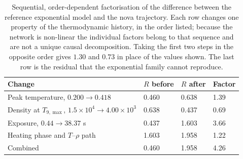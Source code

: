 \begin{table}[h!]
\centering
\caption{Sequential, order-dependent factorisation of the difference between the reference exponential model and the nova trajectory. Each row changes one property of the thermodynamic history, in the order listed; because the network is non-linear the individual factors belong to that sequence and are not a unique causal decomposition. Taking the first two steps in the opposite order gives $1.30$ and $0.73$ in place of the values shown. The last row is the residual that the exponential family cannot reproduce.}
\begin{tabular}{llll}
\hline
Change & $R$ before & $R$ after & Factor \\
\hline
Peak temperature, $0.200 \rightarrow 0.418$ & 0.460 & 0.638 & 1.39 \\
Density at $T_{9,\max}$, $1.5\times10^{4} \rightarrow 4.00\times10^{3}$ & 0.638 & 0.437 & 0.69 \\
Exposure, $0.44 \rightarrow 38.37$ s & 0.437 & 1.603 & 3.66 \\
Heating phase and $T$--$\rho$ path & 1.603 & 1.958 & 1.22 \\
\hline
Combined & 0.460 & 1.958 & 4.26 \\
\hline
\end{tabular}
\label{tab:nucnetpy_decomposition}
\end{table}
